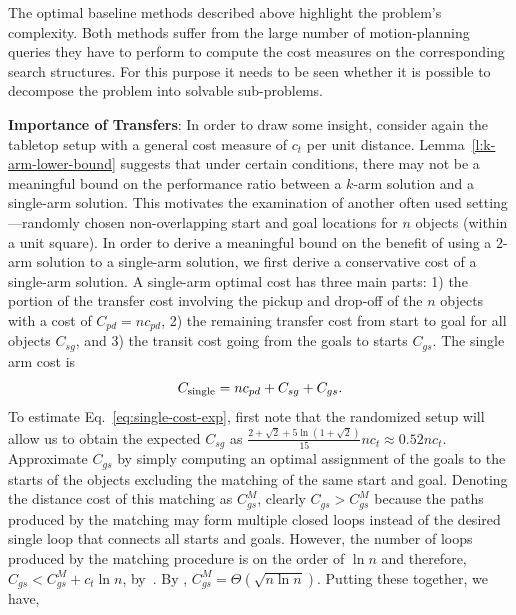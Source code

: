 
The optimal baseline methods described above highlight the problem's complexity. Both methods suffer from the large number of motion-planning queries they have to perform to compute the cost measures on the corresponding search structures. For this purpose it needs to be seen whether it is possible to decompose the problem into solvable sub-problems. 

\noindent\textbf{Importance of Transfers}: In order to draw some insight, consider again the tabletop setup with a general cost measure of $c_t$ per unit distance.
Lemma~\ref{l:k-arm-lower-bound} suggests that under certain conditions, there 
may not be a meaningful bound on the performance ratio between a $k$-arm 
solution and a single-arm solution. This motivates the examination of another
often used setting---randomly chosen non-overlapping 
start and goal locations for $n$ objects (within a unit square). In order to derive a 
meaningful bound on the benefit of using a $2$-arm solution 
to a single-arm solution, we first derive a conservative cost of a single-arm solution. 
A single-arm optimal cost has three main parts: 1) the portion of the transfer cost involving the pickup and 
drop-off of the $n$ objects with a cost of $C_{pd} = nc_{pd}$, 2) the remaining transfer cost from 
start to goal for all objects $C_{sg}$, and 3) the transit cost 
going from the goals to starts $C_{gs}$. The single arm cost is  
\vspace{-0.1in}
\begin{equation}
\label{eq:single-cost-exp}
C_{\rm single} = nc_{pd} + C_{sg} + C_{gs}.
\vspace{-0.1in}
\end{equation}
To estimate Eq.~\ref{eq:single-cost-exp}, first note that the randomized setup 
will allow us to obtain the expected $C_{sg}$\cite{santalo2004integral} as
$\frac{2 + \sqrt{2} + 5\ln(1+\sqrt{2})}{15}nc_t \approx 0.52nc_t$.
Approximate $C_{gs}$ by simply computing an optimal assignment of the 
goals to the starts of the objects excluding the matching of the same start 
and goal. Denoting the distance cost of this matching as $C_{gs}^M$, clearly
$C_{gs} > C_{gs}^M$ because the paths produced by the matching may form 
multiple closed loops instead of the desired single loop that connects all 
starts and goals. However, the number of loops produced by the matching 
procedure is on the order of $\ln n$ and therefore, $C_{gs} < C_{gs}^M + 
c_t\ln n$, by~\cite{TrePavFra13}. By \cite{AjtKomTus84}, 
$C_{gs}^M = \Theta(\sqrt{n\ln n})$. Putting these together, we have,

